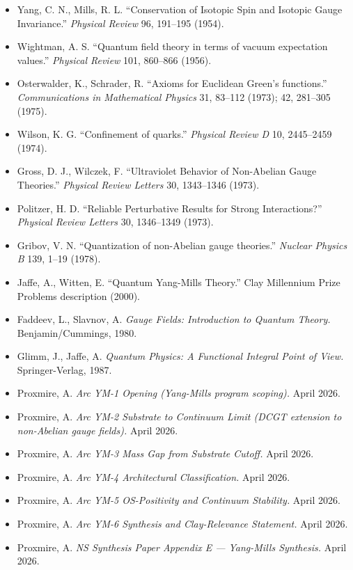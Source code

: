 \documentclass[11pt,a4paper]{article}
\begin{document}
\begin{itemize}[noitemsep]
\item Yang, C. N., Mills, R. L. ``Conservation of Isotopic Spin and Isotopic Gauge Invariance.'' \textit{Physical Review} 96, 191--195 (1954).
\item Wightman, A. S. ``Quantum field theory in terms of vacuum expectation values.'' \textit{Physical Review} 101, 860--866 (1956).
\item Osterwalder, K., Schrader, R. ``Axioms for Euclidean Green's functions.'' \textit{Communications in Mathematical Physics} 31, 83--112 (1973); 42, 281--305 (1975).
\item Wilson, K. G. ``Confinement of quarks.'' \textit{Physical Review D} 10, 2445--2459 (1974).
\item Gross, D. J., Wilczek, F. ``Ultraviolet Behavior of Non-Abelian Gauge Theories.'' \textit{Physical Review Letters} 30, 1343--1346 (1973).
\item Politzer, H. D. ``Reliable Perturbative Results for Strong Interactions?'' \textit{Physical Review Letters} 30, 1346--1349 (1973).
\item Gribov, V. N. ``Quantization of non-Abelian gauge theories.'' \textit{Nuclear Physics B} 139, 1--19 (1978).
\item Jaffe, A., Witten, E. ``Quantum Yang-Mills Theory.'' Clay Millennium Prize Problems description (2000).
\item Faddeev, L., Slavnov, A. \textit{Gauge Fields: Introduction to Quantum Theory.} Benjamin/Cummings, 1980.
\item Glimm, J., Jaffe, A. \textit{Quantum Physics: A Functional Integral Point of View.} Springer-Verlag, 1987.
\item Proxmire, A. \textit{Arc YM-1 Opening (Yang-Mills program scoping).} April 2026.
\item Proxmire, A. \textit{Arc YM-2 Substrate to Continuum Limit (DCGT extension to non-Abelian gauge fields).} April 2026.
\item Proxmire, A. \textit{Arc YM-3 Mass Gap from Substrate Cutoff.} April 2026.
\item Proxmire, A. \textit{Arc YM-4 Architectural Classification.} April 2026.
\item Proxmire, A. \textit{Arc YM-5 OS-Positivity and Continuum Stability.} April 2026.
\item Proxmire, A. \textit{Arc YM-6 Synthesis and Clay-Relevance Statement.} April 2026.
\item Proxmire, A. \textit{NS Synthesis Paper Appendix E --- Yang-Mills Synthesis.} April 2026.

\end{itemize}
\end{document}
